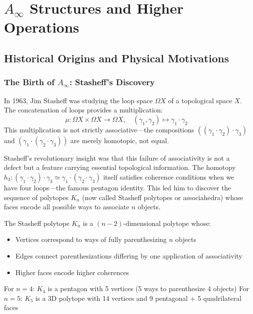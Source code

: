 \chapter{$A_\infty$ Structures and Higher Operations}


\section{Historical Origins and Physical Motivations}

\subsection{The Birth of $A_\infty$: Stasheff's Discovery}

In 1963, Jim Stasheff was studying the loop space $\Omega X$ of a topological space $X$. The concatenation of loops provides a multiplication:
$$\mu: \Omega X \times \Omega X \to \Omega X, \quad (\gamma_1, \gamma_2) \mapsto \gamma_1 \cdot \gamma_2$$
This multiplication is not strictly associative—the compositions $((\gamma_1 \cdot \gamma_2) \cdot \gamma_3)$ and $(\gamma_1 \cdot (\gamma_2 \cdot \gamma_3))$ are merely homotopic, not equal. 

Stasheff's revolutionary insight was that this failure of associativity is not a defect but a feature carrying essential topological information. The homotopy $h_3: (\gamma_1 \cdot \gamma_2) \cdot \gamma_3 \simeq \gamma_1 \cdot (\gamma_2 \cdot \gamma_3)$ itself satisfies coherence conditions when we have four loops—the famous pentagon identity. This led him to discover the sequence of polytopes $K_n$ (now called Stasheff polytopes or associahedra) whose faces encode all possible ways to associate $n$ objects.

\begin{remark}
The Stasheff polytope $K_n$ is a $(n-2)$-dimensional polytope whose:
\begin{itemize}
\item Vertices correspond to ways of fully parenthesizing $n$ objects
\item Edges connect parenthesizations differing by one application of associativity
\item Higher faces encode higher coherences
\end{itemize}
For $n=4$: $K_4$ is a pentagon with 5 vertices (5 ways to parenthesize 4 objects)
For $n=5$: $K_5$ is a 3D polytope with 14 vertices and 9 pentagonal + 5 quadrilateral faces
\end{remark}


